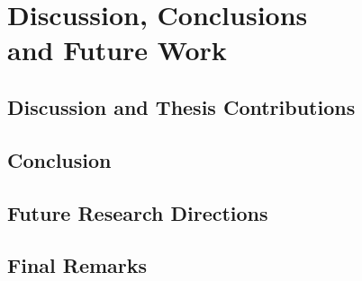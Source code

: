 
\chapter[Discussion, Conclusions and Future Work]{Discussion, Conclusions\\and Future Work}\label{chap:conclusions}


\section{Discussion and Thesis Contributions}


\section{Conclusion}


\section{Future Research Directions}

\section{Final Remarks}